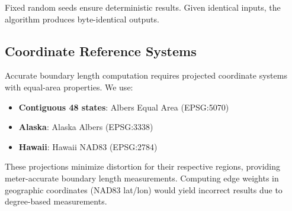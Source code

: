 Fixed random seeds ensure deterministic results. Given identical inputs, the algorithm produces byte-identical outputs.

\subsection{Coordinate Reference Systems}

Accurate boundary length computation requires projected coordinate systems with equal-area properties. We use:

\begin{itemize}
\item \textbf{Contiguous 48 states}: Albers Equal Area (EPSG:5070)
\item \textbf{Alaska}: Alaska Albers (EPSG:3338)
\item \textbf{Hawaii}: Hawaii NAD83 (EPSG:2784)
\end{itemize}

These projections minimize distortion for their respective regions, providing meter-accurate boundary length measurements. Computing edge weights in geographic coordinates (NAD83 lat/lon) would yield incorrect results due to degree-based measurements.
